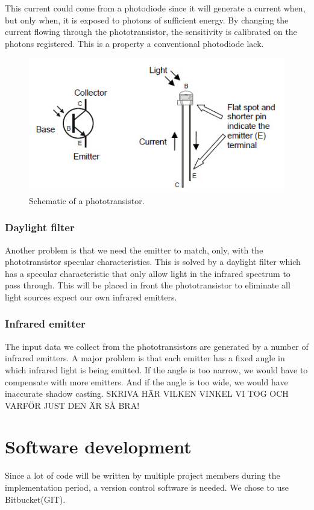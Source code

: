 This current could come from a photodiode since it will generate a current when, 
but only when, it is exposed to photons of sufficient energy. By changing the current 
flowing through the phototransistor, the sensitivity is calibrated on the photons 
registered. This is a property a conventional photodiode lack.

\begin{figure}[htb]
\begin{center}
\includegraphics[scale=0.75]{fig/phototrans}
\caption{Schematic of a phototransistor.}
\label{fig: Phototransistor}
\end{center}
\end{figure}


\subsubsection{Daylight filter}
Another problem is that we need the emitter to match, only, with the phototransistor 
specular characteristics. This is solved by a daylight filter which has a specular 
characteristic that only allow light in the infrared spectrum to pass through. This 
will be placed in front the phototransistor to eliminate all light sources expect our 
own infrared emitters.

\subsubsection{Infrared emitter}
The input data we collect from the phototransistors are generated by a number of infrared 
emitters. A major problem is that each emitter has a fixed angle in which infrared light is 
being emitted. If the angle is too narrow, we would have to compensate with more emitters. 
And if the angle is too wide, we would have inaccurate shadow casting. 
SKRIVA HÄR VILKEN VINKEL VI TOG OCH VARFÖR JUST DEN ÄR SÅ BRA!

\section{Software development}
Since a lot of code will be written by multiple project members during the 
implementation period,  a version control software is needed. We chose to use Bitbucket(GIT).

